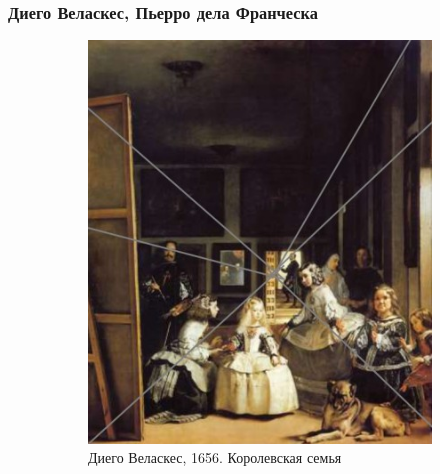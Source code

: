 \documentclass[a4paper, 14pt]{extarticle}
\begin{document}
\subsubsection{Диего Веласкес, Пьерро дела Франческа}
\begin{figure}[h]
	\centering
	\begin{subfigure}[b]{0.45\textwidth}
		\centering
		\includegraphics[width=\textwidth]{l5/S011.jpg}
		\caption{Диего Веласкес, 1656. Королевская семья}
		\label{renproj2}
	\end{subfigure}
	\begin{subfigure}[b]{0.45\textwidth}
		\centering

\end{subfigure}
\end{figure}
\end{document}
